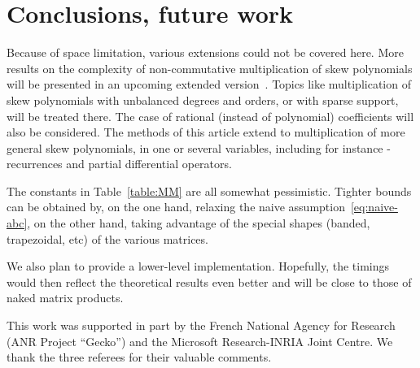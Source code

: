 \documentclass{sig-alt-full}
\begin{document}
\section{Conclusions, future work}

Because of space limitation, various extensions could not be covered here.
More results
on the complexity of non-commutative multiplication of skew polynomials
will be
presented in an upcoming extended version~\cite{LongVersion}.
Topics like multiplication of skew
polynomials with unbalanced degrees and orders, or with sparse support, will be treated there.
The case of
rational (instead of polynomial) coefficients will also be considered.
The methods of this
article extend to multiplication of more general skew polynomials, in one or several variables,
including for instance -recurrences and partial differential operators.

The constants in Table~\ref{table:MM} are all somewhat pessimistic.
Tighter bounds can be obtained by, on the one hand, relaxing the naive assumption~\eqref{eq:naive-abc}, on the other hand, taking advantage of the special shapes (banded, trapezoidal, etc) of the various matrices.

We also plan to provide a lower-level implementation.
Hopefully, the timings would then reflect the theoretical results even better and will be close to those of naked matrix products.



\smallskip{} This work was supported in part by the French National Agency for Research (ANR Project ``Gecko'') and the Microsoft Research-INRIA Joint Centre.
We thank the three referees for their valuable comments.
\end{document}
